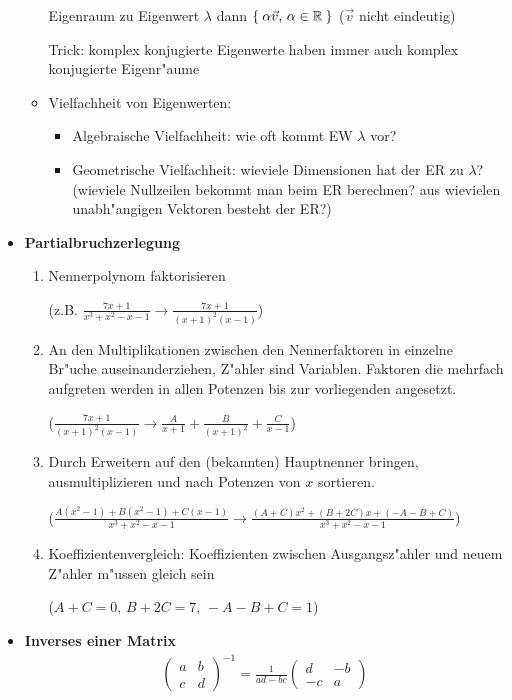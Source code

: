 \documentclass[fleqn,12pt]{scrartcl}
\begin{document}
\begin{itemize}
\begin{itemize}
				Eigenraum zu Eigenwert $\lambda$ dann $\Set{\alpha \vec v,\, \alpha \in \mathbb{R}}$ ($\vec v$ nicht eindeutig)

				Trick: komplex konjugierte Eigenwerte haben immer auch komplex konjugierte Eigenr"aume
			\item
				Vielfachheit von Eigenwerten:
				\begin{itemize}
					\item Algebraische Vielfachheit: wie oft kommt EW $\lambda$ vor?
					\item
						Geometrische Vielfachheit: wieviele Dimensionen hat der ER zu $\lambda$? (wieviele Nullzeilen bekommt man beim ER berechnen? aus wievielen unabh"angigen Vektoren besteht der ER?)

				\end{itemize}
		\end{itemize}

	\item
		\textbf{Partialbruchzerlegung}

		\begin{enumerate}
			\item
				Nennerpolynom faktorisieren 

				(z.B. $\frac{7x+1}{x^3 + x^2 -x -1} \rightarrow \frac{7x+1}{(x+1)^2(x-1)}$)
			\item
				An den Multiplikationen zwischen den Nennerfaktoren in einzelne Br"uche auseinanderziehen, Z"ahler sind Variablen. Faktoren die mehrfach aufgreten werden in allen Potenzen bis zur vorliegenden angesetzt.

				($\frac{7x+1}{(x+1)^2(x-1)} \rightarrow \frac{A}{x+1} + \frac{B}{(x+1)^2} + \frac{C}{x-1}$)
			\item
				Durch Erweitern auf den (bekannten) Hauptnenner bringen, ausmultiplizieren und nach Potenzen von $x$ sortieren.

				($\frac{A(x^2-1) + B(x^2-1) + C(x-1)}{x^3+x^2 -x -1} \rightarrow \frac{(A+C)x^2 + (B+2C)x + (-A- B+C)}{x^3 + x^2 -x -1}$)

			\item
				Koeffizientenvergleich: Koeffizienten zwischen Ausgangsz"ahler und neuem Z"ahler m"ussen gleich sein 

				($A+C = 0,\, B+2C = 7,\, -A-B+C =1$)

		\end{enumerate}
		
	\item
		\textbf{Inverses einer Matrix} 
		\begin{align*}
			\begin{pmatrix} a & b \\ c & d \end{pmatrix}^{-1} = 
				\frac{1}{ad-bc} \begin{pmatrix} d & -b \\ -c & a \end{pmatrix}
		\end{align*}
\end{itemize}
\end{document}
